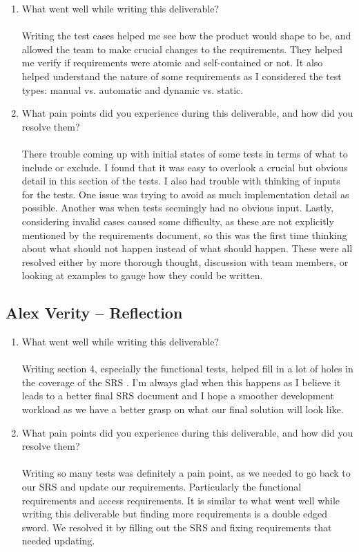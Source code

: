 \documentclass[12pt, titlepage]{article}
\begin{document}
\begin{enumerate}
  \item What went well while writing this deliverable?\\\\
  Writing the test cases helped me see how the product would shape to 
  be, and allowed the team to make crucial changes to the requirements. 
  They helped me verify if requirements were atomic and self-contained 
  or not. It also helped understand the nature of some requirements as 
  I considered the test types: manual vs. automatic and dynamic vs. 
  static.  
  \item What pain points did you experience during this deliverable, and how
  did you resolve them?\\\\
  There trouble coming up with initial states of some tests in terms of 
  what to include or exclude. I found that it was easy to overlook a 
  crucial but obvious detail in this section of the tests. I also had 
  trouble with thinking of inputs for the tests. One issue was trying 
  to avoid as much implementation detail as possible. Another was 
  when tests seemingly had no obvious input. Lastly, considering 
  invalid cases caused some difficulty, as these are not explicitly 
  mentioned by the requirements document, so this was the first time 
  thinking about what should not happen instead of what should happen.
  These were all resolved either by more thorough thought, discussion 
  with team members, or looking at examples to gauge how they could be 
  written.
\end{enumerate}

\subsection*{Alex Verity -- Reflection}

\begin{enumerate}

  \item What went well while writing this deliverable?\\\\
  Writing section 4, especially the functional tests, helped fill in a lot of
  holes in the coverage of the SRS \cite{SRS}. I'm always glad when this
  happens as I believe it leads to a better final SRS document and I hope a
  smoother development workload as we have a better grasp on what our final
  solution will look like.
  \item What pain points did you experience during this deliverable, and how
  did you resolve them?\\\\
  Writing so many tests was definitely a pain point, as we needed to go back
  to our SRS and update our requirements. Particularly the functional
  requirements and access requirements. It is similar to what went well while
  writing this deliverable but finding more requirements is a double edged
  sword. We resolved it by filling out the SRS and fixing requirements that
  needed updating.

\end{enumerate}
\end{document}
